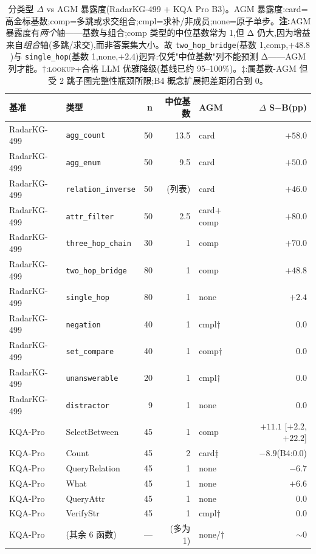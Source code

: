 \documentclass[11pt,a4paper]{article}
\newcommand{\qtype}[1]{\texttt{\small #1}}
\newcommand{\op}[1]{\textsc{\small #1}}
\begin{document}
\begin{table}[t]
\centering\small
\caption{分类型 $\Delta$ vs AGM 暴露度(RadarKG-499 + KQA Pro B3)。AGM 暴露度:\textsf{card}=高金标基数;\textsf{comp}=多跳或求交组合;\textsf{cmpl}=求补/非成员;\textsf{none}=原子单步。\textbf{注:}AGM 暴露度有\emph{两个}轴——基数与组合;\textsf{comp} 类型的中位基数常为 1,但 Δ 仍大,因为增益来自\emph{组合}轴(多跳/求交),而非答案集大小。故 \qtype{two\_hop\_bridge}(基数 1,\textsf{comp},$+48.8$)与 \qtype{single\_hop}(基数 1,\textsf{none},$+2.4$)迥异:仅凭"中位基数"列不能预测 Δ——AGM 列才能。$\dagger$:\op{lookup}+合格 LLM 优雅降级(基线已约 95--100\%)。$\ddagger$:属基数-AGM 但受 2 跳子图完整性瓶颈所限;B4 概念扩展把差距闭合到 0。}
\label{tab:agm}
\setlength{\tabcolsep}{5pt}
\begin{tabular}{l l r r l r}
\toprule
\textbf{基准} & \textbf{类型} & \textbf{n} & \textbf{中位基数} & \textbf{AGM} & \textbf{$\Delta$ S$-$B(pp)} \\
\midrule
RadarKG-499 & \qtype{agg\_count}        & 50 & 13.5 & card       & $\mathbf{+58.0}$ \\
RadarKG-499 & \qtype{agg\_enum}         & 50 &  9.5 & card       & $\mathbf{+50.0}$ \\
RadarKG-499 & \qtype{relation\_inverse} & 50 & (列表) & card     & $\mathbf{+46.0}$ \\
RadarKG-499 & \qtype{attr\_filter}      & 50 &  2.5 & card$+$comp & $\mathbf{+80.0}$ \\
RadarKG-499 & \qtype{three\_hop\_chain} & 30 &   1  & comp       & $\mathbf{+70.0}$ \\
RadarKG-499 & \qtype{two\_hop\_bridge}  & 80 &   1  & comp       & $\mathbf{+48.8}$ \\
RadarKG-499 & \qtype{single\_hop}       & 80 &   1  & none       & $+2.4$ \\
RadarKG-499 & \qtype{negation}          & 40 &   1  & cmpl$\dagger$ & $0.0$ \\
RadarKG-499 & \qtype{set\_compare}      & 40 &   1  & comp$\dagger$ & $0.0$ \\
RadarKG-499 & \qtype{unanswerable}      & 20 &   1  & cmpl$\dagger$ & $0.0$ \\
RadarKG-499 & \qtype{distractor}        &  9 &   1  & none       & $0.0$ \\
\midrule
KQA-Pro     & SelectBetween       & 45 &   1  & comp       & $\mathbf{+11.1}$ [$+2.2$, $+22.2$] \\
KQA-Pro     & Count               & 45 &   2  & card$\ddagger$ & $-8.9$(B4:$0.0$) \\
KQA-Pro     & QueryRelation       & 45 &   1  & none       & $-6.7$ \\
KQA-Pro     & What                & 45 &   1  & none       & $+6.6$ \\
KQA-Pro     & QueryAttr           & 45 &   1  & none       & $0.0$ \\
KQA-Pro     & VerifyStr           & 45 &   1  & cmpl$\dagger$ & $0.0$ \\
KQA-Pro     & (其余 6 函数)       & --- & (多为 1) & none/$\dagger$ & ${\sim}0$ \\
\bottomrule
\end{tabular}
\end{table}
\end{document}
